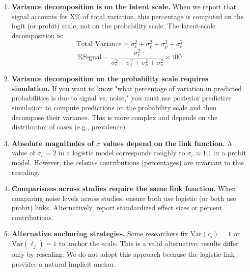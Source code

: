 \begin{enumerate}
    \item \textbf{Variance decomposition is on the latent scale.} When we report that signal accounts for X\% of total variation, this percentage is computed on the logit (or probit) scale, not on the probability scale. The latent-scale decomposition is:
    $$\text{Total Variance} = \sigma_c^2 + \sigma_\ell^2 + \sigma_p^2 + \sigma_o^2$$
    $$\text{\% Signal} = \frac{\sigma_c^2}{\sigma_c^2 + \sigma_\ell^2 + \sigma_p^2 + \sigma_o^2} \times 100$$

    \item \textbf{Variance decomposition on the probability scale requires simulation.} If you want to know "what percentage of variation in predicted probabilities is due to signal vs. noise," you must use posterior predictive simulation to compute predictions on the probability scale and then decompose their variance. This is more complex and depends on the distribution of cases (e.g., prevalence).

    \item \textbf{Absolute magnitudes of $\sigma$ values depend on the link function.} A value of $\sigma_c = 2$ in a logistic model corresponds roughly to $\sigma_c \approx 1.1$ in a probit model. However, the \textit{relative} contributions (percentages) are invariant to this rescaling.

    \item \textbf{Comparisons across studies require the same link function.} When comparing noise levels across studies, ensure both use logistic (or both use probit) links. Alternatively, report standardized effect sizes or percent contributions.

    \item \textbf{Alternative anchoring strategies.} Some researchers fix $\text{Var}(c_i) = 1$ or $\text{Var}(\ell_j) = 1$ to anchor the scale. This is a valid alternative; results differ only by rescaling. We do not adopt this approach because the logistic link provides a natural implicit anchor.
\end{enumerate}


